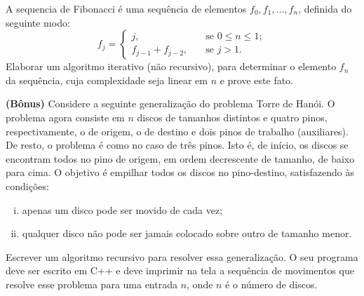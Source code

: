 \documentclass[a4paper,12pt]{exam}
\begin{document}
\begin{questions}
\question[2.5] A sequencia de Fibonacci é uma sequência de elementos $f_0,f_1,\ldots,f_n$, 
definida do seguinte modo:
\[ f_j =
  \begin{cases}
    j,       & \quad \text{se } 0\leq n\leq 1;\\
    f_{j-1} + f_{j-2},  & \quad \text{se } j > 1.
  \end{cases}
\]
Elaborar um algoritmo iterativo (não recursivo), para determinar o elemento $f_n$ da sequência, cuja complexidade seja linear em $n$ e prove este fato.


\bigskip 

\bigskip 

\bigskip 

\question[1] \textbf{(Bônus)} Considere a seguinte generalização do problema Torre de Hanói. O problema 
agora consiste em $n$ discos de tamanhos distintos e quatro pinos, respectivamente, 
o de origem, o de destino e dois pinos de trabalho (auxiliares). De resto, o problema 
é como no caso de três pinos. Isto é, de início, os discos se encontram todos no 
pino de origem, em ordem decrescente de tamanho, de baixo para cima. O objetivo é empilhar
todos os discos no pino-destino, satisfazendo às condições:
\begin{enumerate}[(i)]
 \item apenas um disco pode ser movido de cada vez;
 \item qualquer disco não pode ser jamais colocado sobre outro de tamanho menor.
\end{enumerate}
Escrever um algoritmo recursivo para resolver essa generalização. O seu programa deve ser escrito em C++ e deve imprimir na tela a sequência de movimentos que resolve esse problema para uma entrada $n$, onde $n$ é o número de discos.


\end{questions}
\end{document}

